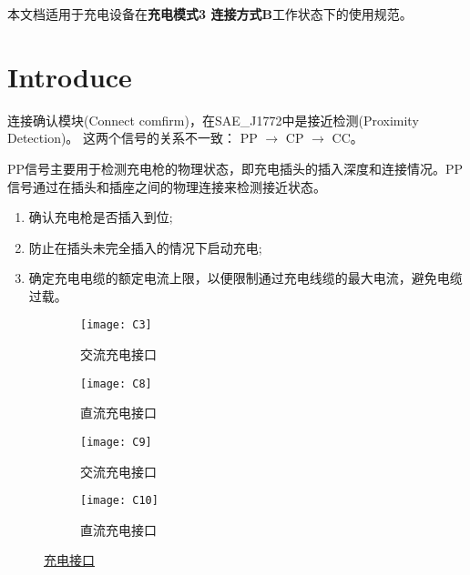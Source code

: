 本文档适用于充电设备在{\bf 充电模式3 连接方式B}工作状态下的使用规范。

\section{Introduce}
 连接确认模块(Connect comfirm)，在SAE\_J1772中是接近检测(Proximity Detection)\cite{SAE}。 
 这两个信号的关系不一致： PP $\longrightarrow$ CP $\longrightarrow$ CC。

 PP信号主要用于检测充电枪的物理状态，即充电插头的插入深度和连接情况。PP信号通过在插头和插座之间的物理连接来检测接近状态。
 \begin{enumerate}
    \item  确认充电枪是否插入到位;
    \item  防止在插头未完全插入的情况下启动充电;
    \item  确定充电电缆的额定电流上限，以便限制通过充电线缆的最大电流，避免电缆过载。
 \end{enumerate}


\begin{figure}[!htbp]
    \centering
    \begin{subfigure}[b]{0.45\textwidth}
        \centering
        \texttt{[image: C3]} 
        \caption{交流充电接口}
        \label{fig:C3}
    \end{subfigure}
    \hspace*{-0.6cm}
    \begin{subfigure}[b]{0.45\textwidth}
        \centering
        \texttt{[image: C8]} 
        \caption{直流充电接口}
        \label{fig:C8}
    \end{subfigure}
    \begin{subfigure}[b]{0.45\textwidth}
        \centering
        \texttt{[image: C9]} 
        \caption{交流充电接口\cite{GB20234_2}}
        \label{fig:C9}
    \end{subfigure}
    \hspace*{-0.6cm}
    \begin{subfigure}[b]{0.45\textwidth}
        \centering
        \texttt{[image: C10]} 
        \caption{直流充电接口\cite{GB20234_3}}
        \label{fig:C10}
    \end{subfigure}
    \caption{\href{https://www.chooseauto.com.cn/news/89436.shtml}{充电接口}}
    \label{fig:main}
\end{figure}



